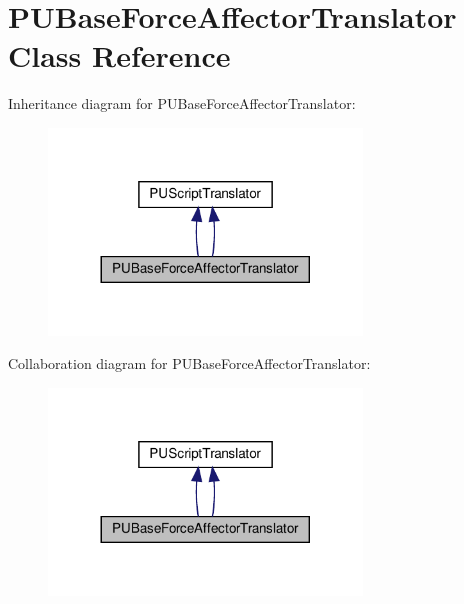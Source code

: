 \hypertarget{classPUBaseForceAffectorTranslator}{}\section{P\+U\+Base\+Force\+Affector\+Translator Class Reference}
\label{classPUBaseForceAffectorTranslator}


Inheritance diagram for P\+U\+Base\+Force\+Affector\+Translator\+:
\nopagebreak
\begin{figure}[H]
\begin{center}
\leavevmode
\includegraphics[width=236pt]{classPUBaseForceAffectorTranslator__inherit__graph}
\end{center}
\end{figure}


Collaboration diagram for P\+U\+Base\+Force\+Affector\+Translator\+:
\nopagebreak
\begin{figure}[H]
\begin{center}
\leavevmode
\includegraphics[width=236pt]{classPUBaseForceAffectorTranslator__coll__graph}
\end{center}
\end{figure}
